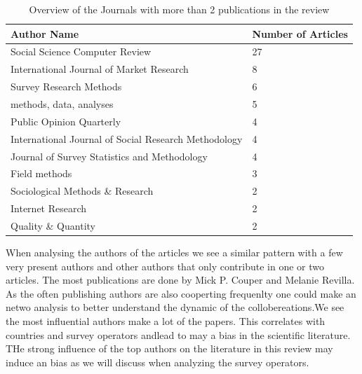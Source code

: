 \begin{table}
	\centering
	\begin{tabular}{ll}
		\toprule
		Author Name & Number of Articles \\
		\midrule
        Social Science Computer Review & 27\\
        International Journal of Market Research & 8\\
        Survey Research Methods& 6\\
        methods, data, analyses & 5\\
        Public Opinion Quarterly & 4\\
        International Journal of Social Research Methodology & 4\\
        Journal of Survey Statistics and Methodology & 4\\
        Field methods & 3\\
        Sociological Methods \& Research & 2\\
        Internet Research & 2 \\
        Quality \& Quantity  & 2\\
		\bottomrule 
	\end{tabular}
	\caption{Overview of the Journals with more than 2 publications in the review}
	\label{tab: journals}
\end{table}

When analysing the authors of the articles we see a similar pattern with a few very present authors and other authors that only contribute in one or two articles. The most publications are done by Mick P. Couper and Melanie Revilla. As the often publishing authors are also cooperting frequenlty one could make an netwo analysis to better understand the dynamic of the collobereations.We see the most influential authors make a lot of the papers. This correlates with countries and survey operators andlead to may a bias in the scientific literature. THe strong influence of the top authors on the literature in this review may induce an bias as we will discuss when analyzing the survey operators.

